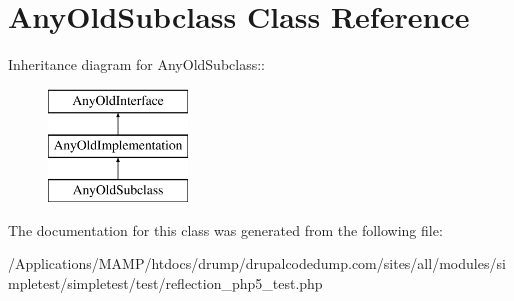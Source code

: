 \hypertarget{class_any_old_subclass}{
\section{AnyOldSubclass Class Reference}
\label{class_any_old_subclass}
}
Inheritance diagram for AnyOldSubclass::\begin{figure}[H]
\begin{center}
\leavevmode
\includegraphics[height=3cm]{class_any_old_subclass}
\end{center}
\end{figure}


The documentation for this class was generated from the following file:\begin{DoxyCompactItemize}
\item 
/Applications/MAMP/htdocs/drump/drupalcodedump.com/sites/all/modules/simpletest/simpletest/test/reflection\_\-php5\_\-test.php\end{DoxyCompactItemize}
